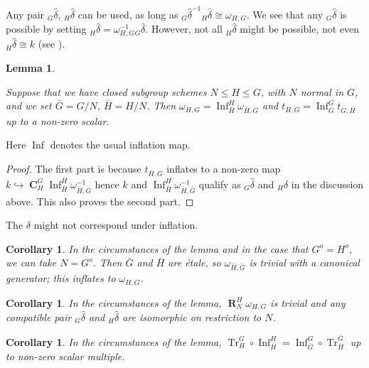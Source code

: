 \documentclass[12pt]{amsart}
\newtheorem{lemma}[theorem]{Lemma}
\newtheorem{corollary}[theorem]{Corollary}
\theoremstyle{definition}
\DeclareMathOperator{\coind}{\mathbf{C}}
\DeclareMathOperator{\res}{\mathbf{R}}
\DeclareMathOperator{\Tr}{Tr}
\DeclareMathOperator{\infl}{Inf}
\begin{document}
Any pair  ${}_G \hat{\delta}$, ${}_H \hat{\delta}$ can be used, as long as ${}_G \hat{\delta}^{-1}{}_H \hat{\delta} \cong \omega_{H,G}$. We see that any ${}_G \hat{\delta}$ is possible by setting ${}_H \hat{\delta}=   \omega^{-1}_{H,G}  {}_G \hat{\delta} $.  However, not all ${}_H \hat{\delta}$ might be possible, not even ${}_H \hat{\delta} \cong k$ (see  \cite[II 3.4]{MR2015057}).

\begin{lemma}
	\label{inf}
	
	Suppose that we have closed subgroup schemes $N \leq H \leq G$, with $N$ normal in $G$, and we set $\bar{G} = G/N$, $\bar{H}=H/N$. Then $\omega_{H,G} = \infl^H_{\bar{H}} \omega_{\bar{H}, \bar{G}}$ and $t_{H,G} = \infl^G_{\bar{G}} t_{\bar{G},\bar{H}}$ up to a non-zero scalar. 

\end{lemma}

Here $\infl$ denotes the usual inflation map.

\begin{proof}
The first part is because $t_{\bar{H},\bar{G}}$ inflates to a non-zero map $k \hookrightarrow  \coind^G_H  \infl^H_{\bar{H}} \omega_{\bar{H}, \bar{G}}^{-1}$ hence $k$ and $\infl^H_{\bar{H}} \omega_{\bar{H}, \bar{G}}^{-1}$ qualify as ${}_G \hat{\delta}$ and ${}_H \hat{\delta}$ in the discussion above. This also proves the second part. 
\end{proof}

The $\delta$ might not correspond under inflation.

\begin{corollary}\label{cor:extra} In the circumstances of the lemma and in the case that $G^o=H^o$, we can take $N=G^o$. Then $\bar{G}$ and $\bar{H}$ are \'{e}tale, so $\omega_{\bar{H}, \bar{G}}$ is trivial with a canonical generator; this inflates to $\omega_{H, G}$.
	\end{corollary}

\begin{corollary} In the circumstances of the lemma, $\res ^H_N \omega_{H,G}$ is trivial and any compatible pair ${}_G \hat{\delta}$ and ${}_H \hat{\delta}$ are isomorphic on restriction to $N$. 
	\end{corollary}
	
	\begin{corollary}
		In the circumstances of the lemma, $\Tr^G_H \circ \infl^H_{\bar{H}} = \infl^G_{\bar{G}} \circ \Tr^{\bar{G}}_{\bar{H}}$ up to non-zero scalar multiple.
	\end{corollary}
\end{document}
